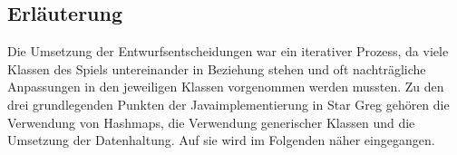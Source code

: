 \subsection{Erläuterung}
\label{sub:fachkonzept-implementierung-erlaeuterung}


Die Umsetzung der Entwurfsentscheidungen war ein iterativer Prozess, da viele Klassen des Spiels untereinander in Beziehung stehen und oft nachträgliche Anpassungen in den jeweiligen Klassen vorgenommen werden mussten. Zu den drei grundlegenden Punkten der Javaimplementierung in Star Greg gehören die Verwendung von Hashmaps, die Verwendung generischer Klassen und die Umsetzung der Datenhaltung. Auf sie wird im Folgenden näher eingegangen.







\autorende{}
